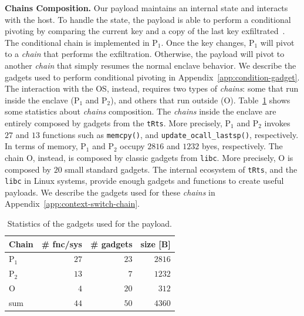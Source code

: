 \textbf{Chains Composition.}
\label{ssec:chain-composition}
Our payload maintains an internal state and interacts with the 
host.
To handle the state, the payload is able to perform a conditional pivoting
by comparing the current key and a copy of the last key 
exfiltrated~\cite{geometry2007}.
The conditional chain is implemented in P$_1$.
Once the key changes, P$_1$ will pivot to a \emph{chain} that performs the 
exfiltration. Otherwise, the payload will pivot to 
another \emph{chain} that simply resumes the normal enclave behavior.
We describe the gadgets used to perform conditional pivoting in 
Appendix~\ref{app:condition-gadget}.
The interaction with the OS, instead, requires two types of \emph{chains}: some 
that run inside the enclave (\ie P$_1$ and P$_2$), and others that run outside
(\ie O).
Table~\ref{tbl:gadgets} shows some statistics about \emph{chains} composition.
The \emph{chains} inside the enclave are entirely composed by gadgets from the 
\texttt{tRts}.
More precisely, P$_1$ and P$_2$ invokes $27$ and $13$ functions such as 
\texttt{memcpy()}, and \texttt{update\_ocall\_lastsp()}, respectively.
In terms of memory, P$_1$ and P$_2$ occupy $2816$ and $1232$ byes, 
respectively.
The chain O, instead, is composed by classic gadgets from \texttt{libc}.
More precisely, O is composed by $20$ small standard gadgets. 
The internal ecosystem of \texttt{tRts}, and the \texttt{libc} in Linux 
systems, provide
enough gadgets and functions to create useful payloads.
We describe the gadgets used for these \emph{chains} in 
Appendix~\ref{app:context-switch-chain}.

\begin{table}[t]
	\centering
	\begin{tabular}{lrrr}
		\toprule
		Chain & \multicolumn{1}{l}{\# fnc/sys} & \multicolumn{1}{l}{\# gadgets} 
		& \multicolumn{1}{l}{size [B]} 
		\\ \midrule
		P$_1$    & $27$ & $23$ & $2816$ \\
		P$_2$    & $13$ &  $7$ & $1232$ \\
		O     	 & $4$ &  $20$ & $312$ \\ \midrule
		sum   	 & $44$ &  $50$ & $4360$ \\ \bottomrule
	\end{tabular}
	\caption{Statistics of the gadgets used for the payload.}
	\label{tbl:gadgets}
\end{table}


